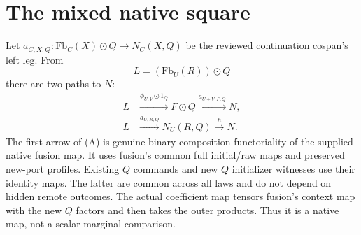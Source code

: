 \documentclass[11pt]{article}\usepackage{amsmath,amssymb,amsthm,geometry}\geometry{margin=1in}\newtheorem{theorem}{Theorem}
\begin{document}
\section{The mixed native square}
Let $a_{C,X,Q}:\mathrm{Fb}_C(X)\odot Q\to N_C(X,Q)$ be the reviewed continuation cospan's left leg. From
\[
                         L=(\mathrm{Fb}_U(R))\odot Q
\]
there are two paths to $N$:
\[
\begin{split}
 L&\xrightarrow{\phi_{U,V}\odot1_Q}F\odot Q
         \xrightarrow{a_{U+V,P,Q}}N,                 \tag{A}\\
 L&\xrightarrow{a_{U,R,Q}}N_U(R,Q)
         \xrightarrow h N.                          \tag{B}
\end{split}
\]
The first arrow of (A) is genuine binary-composition functoriality of the supplied native fusion map. It uses fusion's common full initial/raw maps and preserved new-port profiles. Existing $Q$ commands and new $Q$ initializer witnesses use their identity maps. The latter are common across all laws and do not depend on hidden remote outcomes. The actual coefficient map tensors fusion's context map with the new $Q$ factors and then takes the outer products. Thus it is a native map, not a scalar marginal comparison.
\end{document}
